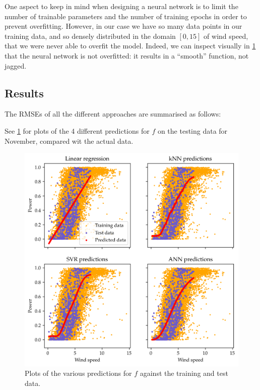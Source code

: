 \documentclass[11pt]{article}
\begin{document}
One aspect to keep in mind when designing a neural network is to limit the number of trainable parameters and the number of training epochs in order to prevent overfitting.
However, in our case we have so many data points in our training data, and so densely distributed in the domain $[0, 15]$ of wind speed, that we were never able to overfit the model.
Indeed, we can inspect visually in \cref{fig:q1-prediction-plots} that the neural network is not overfitted: it results in a ``smooth'' function, not jagged.


\subsection*{Results}

The RMSEs of all the different approaches are summarised as follows:
\begin{center}
\end{center}

See \cref{fig:q1-prediction-plots} for plots of the 4 different predictions for $f$ on the testing data for November, compared wit the actual data.

\begin{figure}
  \centering
  \includegraphics{figures/q1_prediction_plots.png}
  \caption{Plots of the various predictions for $f$ against the training and test data.}
  \label{fig:q1-prediction-plots}
\end{figure}
\end{document}
